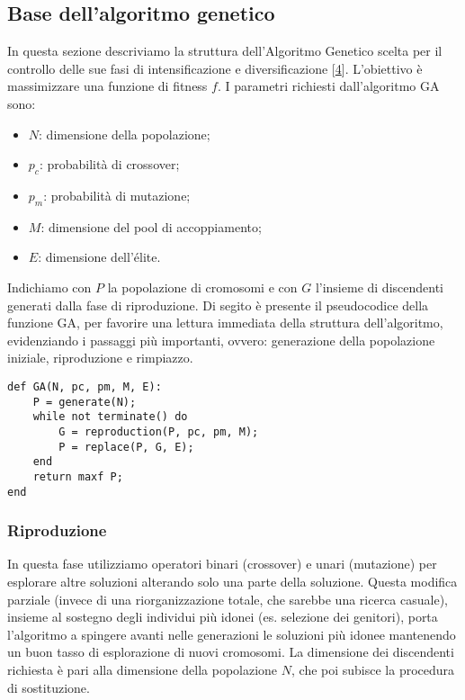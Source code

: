 \subsection{Base dell'algoritmo genetico} \hypertarget{ga}{}

In questa sezione descriviamo la struttura dell'Algoritmo Genetico scelta per il controllo delle sue fasi di intensificazione e diversificazione [\hyperlink{bibliografia}{4}].
L'obiettivo è massimizzare una funzione di fitness $f$. I parametri richiesti dall'algoritmo GA sono:

\begin{itemize}
    \item $N$: dimensione della popolazione;
    \item $p_c$: probabilità di crossover;
    \item $p_m$: probabilità di mutazione;
    \item $M$: dimensione del pool di accoppiamento;
    \item $E$: dimensione dell'élite.
\end{itemize}

Indichiamo con $P$ la popolazione di cromosomi e con $G$ l'insieme di discendenti generati dalla fase di riproduzione. Di segito è presente il pseudocodice della funzione GA, per favorire una lettura immediata della struttura dell'algoritmo, evidenziando i passaggi più importanti, ovvero: generazione della popolazione iniziale, riproduzione e rimpiazzo.

\begin{lstlisting}
def GA(N, pc, pm, M, E):
    P = generate(N);
    while not terminate() do
        G = reproduction(P, pc, pm, M);
        P = replace(P, G, E);
    end
    return maxf P;
end
\end{lstlisting}

\subsubsection{Riproduzione}
In questa fase utilizziamo operatori binari (crossover) e unari (mutazione) per esplorare altre soluzioni alterando solo una parte della soluzione. Questa modifica parziale (invece di una riorganizzazione totale, che sarebbe una ricerca casuale), insieme al sostegno degli individui più idonei (es. selezione dei genitori), porta l'algoritmo a spingere avanti nelle generazioni le soluzioni più idonee mantenendo un buon tasso di esplorazione di nuovi cromosomi. La dimensione dei discendenti richiesta è pari alla dimensione della popolazione $N$, che poi subisce la procedura di sostituzione.

